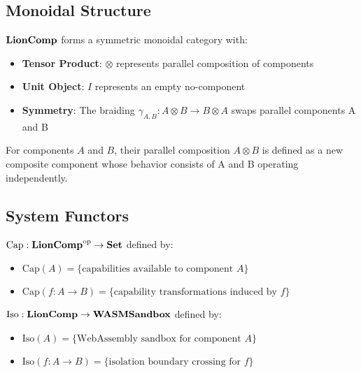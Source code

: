 \subsection{Monoidal Structure}

\begin{definition}
$\mathbf{LionComp}$ forms a symmetric monoidal category with:
\begin{itemize}
\item \textbf{Tensor Product}: $\otimes$ represents parallel composition of components
\item \textbf{Unit Object}: $I$ represents an empty no-component
\item \textbf{Symmetry}: The braiding $\gamma_{A,B}: A \otimes B \to B \otimes A$ swaps parallel components A and B
\end{itemize}
\end{definition}

\begin{definition}
For components $A$ and $B$, their parallel composition $A \otimes B$ is defined as a new composite component whose behavior consists of A and B operating independently.
\end{definition}

\subsection{System Functors}

\begin{definition}
$\text{Cap}: \mathbf{LionComp}^{\text{op}} \to \mathbf{Set}$ defined by:
\begin{itemize}
\item $\text{Cap}(A) = \{\text{capabilities available to component } A\}$
\item $\text{Cap}(f: A \to B) = \{\text{capability transformations induced by } f\}$
\end{itemize}
\end{definition}

\begin{definition}
$\text{Iso}: \mathbf{LionComp} \to \mathbf{WASMSandbox}$ defined by:
\begin{itemize}
\item $\text{Iso}(A) = \{\text{WebAssembly sandbox for component } A\}$
\item $\text{Iso}(f: A \to B) = \{\text{isolation boundary crossing for } f\}$
\end{itemize}
\end{definition}

